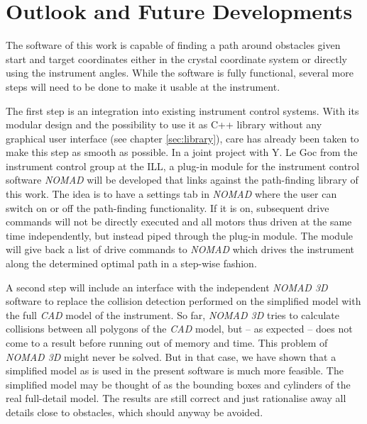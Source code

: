 %
%

\chapter{Outlook and Future Developments}
\label{ch:outlook}
The software of this work is capable of finding a path around obstacles given start and target coordinates 
either in the crystal coordinate system or directly using the instrument angles.
While the software is fully functional, several more steps will need to be done to make it usable
at the instrument.

The first step is an integration into existing instrument control systems. 
With its modular design and the possibility to use it as C++ library without any graphical user interface
(see chapter \ref{sec:library}), care has already been taken to make this step as smooth as possible.
In a joint project with Y. Le Goc from the instrument control group at the ILL, a plug-in module for
the instrument control software \textit{NOMAD} \cite{web_NOMAD} will be developed that links against 
the path-finding library of this work. 
The idea is to have a settings tab in \textit{NOMAD} where the user can switch on or off the path-finding
functionality. If it is on, subsequent drive commands will not be directly executed and all motors thus
driven at the same time independently, but instead piped through the plug-in module. 
The module will give back a list of drive commands to \textit{NOMAD} which drives the instrument
along the determined optimal path in a step-wise fashion.

A second step will include an interface with the independent \textit{NOMAD 3D} \cite{web_NOMAD3d}
software to replace the collision detection performed on the simplified model with the full \textit{CAD}
model \cite{ThalesModel2021} of the instrument.
So far, \textit{NOMAD 3D} tries to calculate collisions between all polygons of the \textit{CAD} model, 
but -- as expected -- does not come to a result before running out of memory and time.
This problem of \textit{NOMAD 3D} might never be solved. 
But in that case, we have shown that a simplified model as is used in the present software is much more 
feasible. 
The simplified model may be thought of as the bounding boxes and cylinders of the real full-detail model.
The results are still correct and just rationalise away all details close to obstacles, which should
anyway be avoided.

